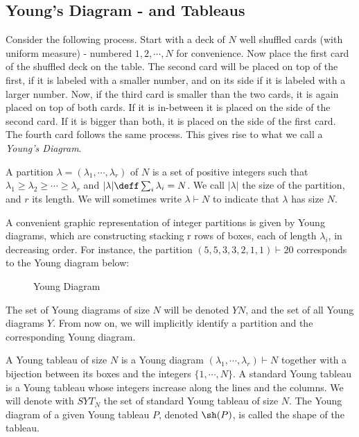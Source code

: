
\subsection{Young's Diagram - and Tableaus}

Consider the following process. Start with a deck of $N$ well shuffled cards (with uniform measure) - numbered $1, 2, \cdots, N$ for convenience. Now place the first card of the shuffled deck on the table. The second card will be placed on top of the first, if it is labeled with a smaller number, and on its side if it is labeled with a larger number. Now, if the third card is smaller than the two cards, it is again placed on top of both cards. If it is in-between it is placed on the side of the second card. If it is bigger than both, it is placed on the side of the first card. The fourth card follows the same process. This gives rise to what we call a \textit{Young's Diagram}.

\begin{definition}
	A partition $\lambda = (\lambda_1, \cdots, \lambda_r)$ of $N$ is a set of positive integers such that $\lambda_1 \geq \lambda_2 \geq  \cdots \geq \lambda_r$ and $|\lambda| \deff \sum_i \lambda_i = N$. We call $|\lambda|$ the size of the partition, and $r$ its length. We will sometimes write $\lambda \vdash N$ to indicate that $\lambda$ has size $N$. 
\end{definition}

A convenient graphic representation of integer partitions is given by Young diagrams, which are constructing stacking r rows of boxes, each of length $\lambda_i$, in decreasing order. For instance, the partition $(5, 5, 3, 3, 2, 1, 1) \vdash 20$ corresponds to the Young diagram below: 
\begin{figure}[h!]
	\centering
	\caption{Young Diagram}
\end{figure}
The set of Young diagrams of size $N$ will be denoted $YN$, and the set of all Young diagrams $Y$. From now on, we will implicitly identify a partition and the corresponding Young diagram. 

\begin{definition}
	A Young tableau of size $N$ is a Young diagram $(\lambda_1, \cdots, \lambda_r) \vdash N$ together with a bijection between its boxes and the integers $\{1, \cdots , N\}$. A standard Young tableau is a Young tableau whose integers increase along the lines and the columns. We will denote with $SYT_N$ the set of standard Young tableau of size $N$. The Young diagram of a given Young tableau $P$, denoted $\sh(P)$, is called the shape of the tableau. 
\end{definition}

